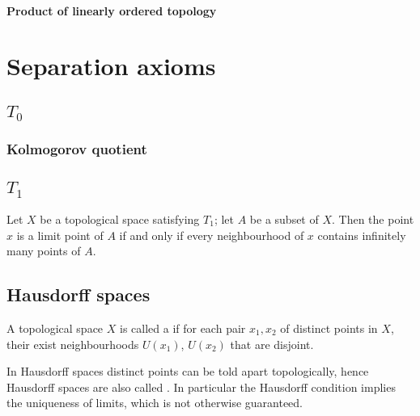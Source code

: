 \paragraph{Product of linearly ordered topology}


\section{Separation axioms}
\subsection{$T_0$}
\subsubsection{Kolmogorov quotient}

\subsection{$T_1$}
\begin{proposition}
Let $X$ be a topological space satisfying $T_1$; let $A$ be a subset of $X$.
Then the point $x$ is a limit point of $A$ \textup{if and only if} every neighbourhood of $x$ contains infinitely many points of $A$.
\end{proposition}
\subsection{Hausdorff spaces}
\begin{definition}
A topological space $X$ is called a  if for each pair $x_1, x_2$ of distinct points in $X$, their exist neighbourhoods $U(x_1)$, $U(x_2)$ that are disjoint.
\end{definition}
In Hausdorff spaces distinct points can be told apart topologically, hence Hausdorff spaces are also called . In particular the Hausdorff condition implies the uniqueness of limits, which is not otherwise guaranteed.


